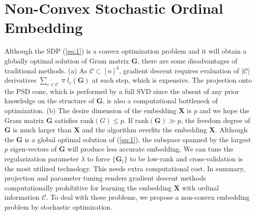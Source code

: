 \documentclass[letterpaper]{article}
\begin{document}
		\section{Non-Convex Stochastic Ordinal Embedding}
		Although the SDP (\ref{eq:1}) is a convex optimization problem and it will obtain a globally optimal solution of Gram matrix $\mathbf{G}$, there are some disadvantages of traditional methods. (a) As $\mathcal{C}\subset[n]^4$, gradient descent requires evaluation of $|\mathcal{C}|$ derivatives $\sum_{c\in\mathcal{C}}\triangledown l_c(\mathbf{G})$ at each step, which is expensive. The projection onto the PSD cone, which is performed by a full SVD since the absent of any prior knowledge on the structure of $\mathbf{G}$, is also a computational bottleneck of optimization. (b) The desire dimension of the embedding $\mathbf{X}$ is $p$ and we hope the Gram matrix $\mathbf{G}$ satisfies $\text{rank}(G)\leq p$. If $\text{rank}(\mathbf{G})\gg p$, the freedom degree of $\mathbf{G}$ is much larger than $\mathbf{X}$ and the algorithm overfits the embedding $\mathbf{X}$. Although the $\mathbf{G}$ is a global optimal solution of (\ref{eq:1}), the subspace spanned by the largest $p$ eigen-vectors of $\mathbf{G}$ will produce less accurate embedding. We can tune the regularization parameter $\lambda$ to force $\{\mathbf{G}_t\}$ to be low-rank and cross-validation is the most utilized technology. This needs extra computational cost. In summary, projection and parameter tuning renders gradient descent methods computationally prohibitive for learning the embedding $\mathbf{X}$ with ordinal information $\mathcal{C}$. To deal with these problems, we propose a non-convex embedding problem by stochastic optimization.
\end{document}
